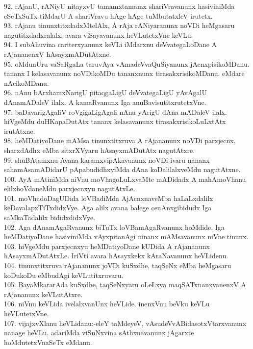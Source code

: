 \documentclass{article}
\begin{document}
92. rAjanU, rANiyU nitayxvU tamamxtamamx shariVravanunx hasiviniMda eSeTxSuTx tiMdarU A shariVravu hAge hAge tuMbutatxleV irutetx.\\
93. rAjanu tinunxtitxdadxMtelAlx, A rAja rANiyaranunx noVDi heMgasaru nagutitxdadxralalx, avara viSayavanunx heVLutetxVne keVLu.\\
94. I subAhuvina  cariterxyanunx keVLi iMdarxnu deVvategaLoDane A rAjananenxV hAsayxmADutAtxne.\\
95. oMdunUru vaSaRgaLa taruvAya vAmadeVvaQuSiyanunx jAcnxpisikoMDanu. tananx I kelasavanunx noVDikoMDu tananxnunx tirasakxrisikoMDanu. eMdare nAcikoMDanu.\\
96. nAnu bArxhamxNarigU pitaqgaLigU deVvategaLigU yAvAgalU dAnamADaleV ilalx. A kamaRvanunx Iga anuBavisutitxrutetxVne.\\
97. baDavarigAgaliV roVgigaLigAgali nAnu yArigU dAna mADaleV ilalx. hiVgeMdu duHKapaDutAtx tananx kelasavanunx tirasakxrisikoLuLxtAtx irutAtxne.\\
98. heMDatiyoDane mAMsa tinunxtitxruva A rAjananunx noVDi parxjecnx, sharxdAdhx eMba sitxrXVyaru hAsayxmADutAtx nagutAtxre.\\
99. shuBAtamxnu Avana karamxvipAkavanunx noVDi ivaru nananx sahamAsamADidarU pApabudidhxyiMda dAna koDalilalxveMdu nagutAtxne.\\
100. AyA mAtiniMda niVnu moVhagoLuLxvaMte mADidadx A mahAmoVhanu elilxhoVdaneMdu parxjecnxyu nagutAtxLe.\\
101. moVhadoDagUDida loVBadiMda AjAcnxnaveMba haLaLxdalilx keDavalapxTiTxdidxVye. Aga alilx avana balege cenAnxgibidudx Iga saMkaTadalilx bididxdidxVye.\\
102. Aga dAnamAgaRvanunx biTuTx loVBamAgaRvanunx hoMdide. Iga  heMDatiyoDane hasiviniMda vAyxpitanAgi ninanx mAMsavanunx niVne tinunx.\\
103. hiVgeMdu parxjecnxyu heMDatiyoDane kUDida A  rAjananunx hAsayxmADutAtxLe. IriVti avara hAsayxkekx kAraNavanunx heVLidenu.\\
104. tinunxtitxruva rAjananunx joVDi kuSxdhe, taqSeNx eMba heMgasaru koDukoDu eMbudAgi keVLutitxruvaru.\\
105. BayaMkararAda kuSxdhe, taqSeNxyaru oLeLxya maqSATxnanxvanenxV A rAjananunx keVLutAtxre.\\
106. niVnu keVLida ivelalxvanUnx heVLide. inenxVnu beVku keVLu heVLutetxVne.\\
107. vijajxvXlanu heVLidanu:-eleY taMdeyeV, vAsudeVvABidasotxVtarxvanunx nanage heVLu. adariMda viSuNxvina sAthxnavanunx jAgarxte hoMdutetxVnaSeTx eMdanu.
\end{document}
